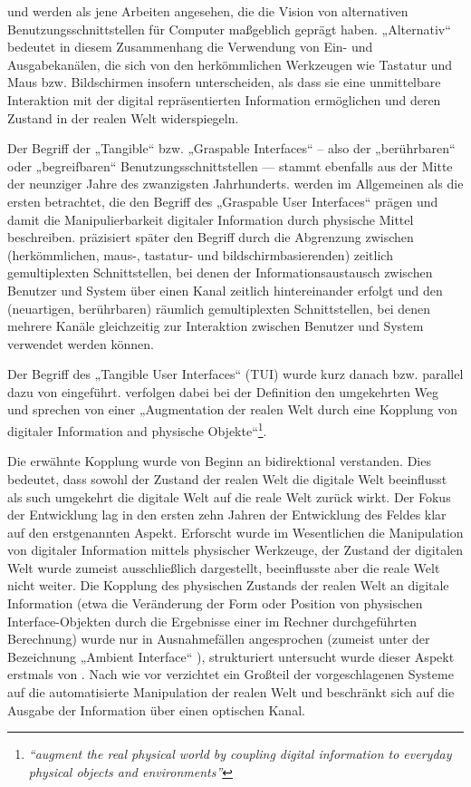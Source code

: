 \citet{Wellner93a} und \citet{Suzuki95} werden als jene Arbeiten angesehen, die die Vision von alternativen Benutzungsschnittstellen für Computer maßgeblich geprägt haben. „Alternativ“ bedeutet in diesem Zusammenhang die Verwendung von Ein- und Ausgabekanälen, die sich von den herkömmlichen Werkzeugen wie Tastatur und Maus bzw. Bildschirmen insofern unterscheiden, als dass sie eine unmittelbare Interaktion mit der digital repräsentierten Information ermöglichen und deren Zustand in der realen Welt widerspiegeln.

Der Begriff der „Tangible“ bzw. „Graspable Interfaces“ – also der „berührbaren“ oder „begreifbaren“ Benutzungsschnittstellen — stammt ebenfalls aus der Mitte der neunziger Jahre des zwanzigsten Jahrhunderts. \citet{Fitzmaurice95} werden im Allgemeinen als die ersten betrachtet, die den Begriff des „Graspable User Interfaces“ prägen und damit die Manipulierbarkeit digitaler Information durch physische Mittel beschreiben. \citet{Fitzmaurice96} präzisiert später den Begriff durch die Abgrenzung zwischen (herkömmlichen, maus-, tastatur- und bildschirmbasierenden) zeitlich gemultiplexten Schnittstellen, bei denen der Informationsaustausch zwischen Benutzer und System über einen Kanal zeitlich hintereinander erfolgt und den (neuartigen, berührbaren) räumlich gemultiplexten Schnittstellen, bei denen mehrere Kanäle gleichzeitig zur Interaktion zwischen Benutzer und System verwendet werden können. 

Der Begriff des „Tangible User Interfaces“ (TUI) wurde kurz danach bzw. parallel dazu von \citet{Ishii97} eingeführt. \citeauthor{Ishii97} verfolgen dabei bei der Definition den umgekehrten Weg und sprechen von einer „Augmentation der realen Welt durch eine Kopplung von digitaler Information and physische Objekte“\footnote{\emph{“augment the real physical world by coupling digital information to everyday physical objects and environments”}\citep{Ishii97}}. 

Die erwähnte Kopplung wurde von Beginn an bidirektional verstanden. Dies bedeutet, dass sowohl der Zustand der realen Welt die digitale Welt beeinflusst als such umgekehrt die digitale Welt auf die reale Welt zurück wirkt. Der Fokus der Entwicklung lag in den ersten zehn Jahren der Entwicklung des Feldes klar auf den erstgenannten Aspekt. Erforscht wurde im Wesentlichen die Manipulation von digitaler Information mittels physischer Werkzeuge, der Zustand der digitalen Welt wurde zumeist ausschließlich dargestellt, beeinflusste aber die reale Welt nicht weiter. Die Kopplung des physischen Zustands der realen Welt an digitale Information (etwa die Veränderung der Form oder Position von physischen Interface-Objekten durch die Ergebnisse einer im Rechner durchgeführten Berechnung) wurde nur in Ausnahmefällen angesprochen (zumeist unter der Bezeichnung „Ambient Interface“ \citep{Gross03}), strukturiert untersucht wurde dieser Aspekt erstmals von \citet{Patten07}. Nach wie vor verzichtet ein Großteil der vorgeschlagenen Systeme auf die automatisierte Manipulation der realen Welt und beschränkt sich auf die Ausgabe der Information über einen optischen Kanal.

